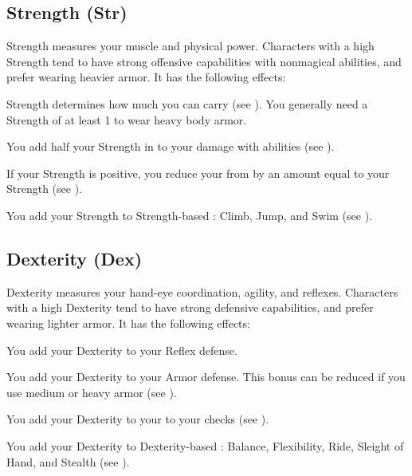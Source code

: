     \subsection{Strength (Str)}\label{Strength}
        {
            Strength measures your muscle and physical power.
            Characters with a high Strength tend to have strong offensive capabilities with nonmagical abilities, and prefer wearing heavier armor.
            It has the following effects:
            \begin{raggeditemize}
                \item Strength determines how much you can carry (see ).
                    You generally need a Strength of at least 1 to wear heavy body armor.
                \item You add half your Strength in  to your damage with  abilities (see ).
                \item If your Strength is positive, you reduce your  from  by an amount equal to your Strength (see ).
                \item You add your Strength to Strength-based : Climb, Jump, and Swim (see ).
            \end{raggeditemize}
        }

    \subsection{Dexterity (Dex)}\label{Dexterity}
        {
            Dexterity measures your hand-eye coordination, agility, and reflexes.
            Characters with a high Dexterity tend to have strong defensive capabilities, and prefer wearing lighter armor.
            It has the following effects:
            \begin{raggeditemize}
                \item You add your Dexterity to your Reflex defense.
                \item You add your Dexterity to your Armor defense.
                    This bonus can be reduced if you use medium or heavy armor (see ).
                \item You add your Dexterity to your to your  checks (see ).
                \item You add your Dexterity to Dexterity-based : Balance, Flexibility, Ride, Sleight of Hand, and Stealth (see ).
            \end{raggeditemize}
        }

